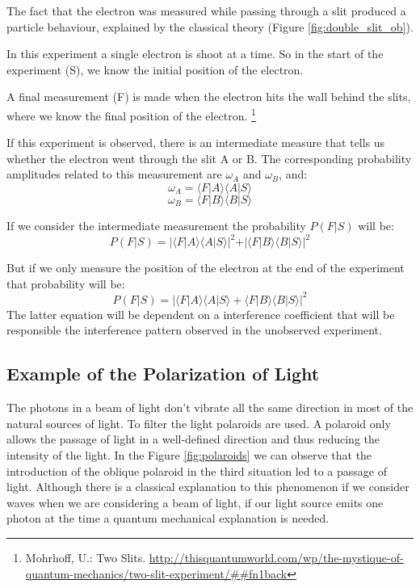 The fact that the electron was measured while passing through a slit produced a particle behaviour, explained by the classical theory (Figure \ref{fig:double_slit_ob}). 


In this experiment a single electron is shoot at a time. So in the start of the experiment (S), we know the initial position of the electron.

A final measurement (F) is made when the electron hits the wall behind the slits, where we know the final position of the electron.
\footnote{Mohrhoff, U.: Two Slits. \url{http://thisquantumworld.com/wp/the-mystique-of-quantum-mechanics/two-slit-experiment/##fn1back}}

If this experiment is observed, there is an intermediate measure that tells us whether the electron went through the slit A or B. The corresponding probability amplitudes related to this measurement are $\omega_{A}$ and $\omega_{B}$, and:
\begin{equation}
\omega_{A} = \langle F \vert A\rangle \langle A \vert S\rangle
\end{equation}
\begin{equation}
\omega_{B} = \langle F \vert B\rangle \langle B \vert S\rangle
\end{equation}

If we consider the intermediate measurement the probability $P(F\vert S)$ will be:
\begin{equation}
P(F\vert S) = 
\vert \langle F \vert A\rangle \langle A \vert S\rangle \vert^{2}
+
\vert \langle F \vert B\rangle \langle B \vert S\rangle \vert^{2}
\end{equation}

But if we only measure the position of the electron at the end of the experiment that probability will be:
\begin{equation}
P(F\vert S) = 
\vert \langle F \vert A\rangle \langle A \vert S\rangle 
+
 \langle F \vert B\rangle \langle B \vert S\rangle \vert^{2}
\end{equation}
The latter equation will be dependent on a interference coefficient that will be responsible the interference pattern observed in the unobserved experiment.



\subsection{Example of the Polarization of Light}
The photons in a beam of light don't vibrate all the same direction in most of the natural sources of light. To filter the light polaroids are used. A polaroid only allows the passage of light in a well-defined direction and thus reducing the intensity of the light. In the Figure \ref{fig:polaroids} we can observe that the introduction of the oblique polaroid in the third situation led to a passage of light. Although there is a classical explanation to this phenomenon if we consider waves when we are considering a beam of light, if our light source emits one photon at the time a quantum mechanical explanation is needed\cite{Rieffel2011}.

